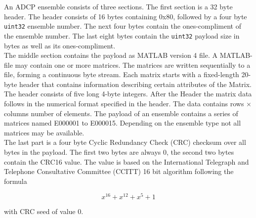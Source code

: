 An ADCP ensemble consists of three sections. The first section is a 32 byte header. The header consists of 16 bytes containing 0x80, followed by a four byte \texttt{uint32} ensemble number. The next four bytes contain the ones-compliment of the ensemble number. The last eight bytes contain the \texttt{uint32} payload size in bytes as well as its ones-compliment.\\
The middle section contains the payload as MATLAB version 4 file. A MATLAB-file may contain one or more matrices. The matrices are written sequentially to a file,  forming a continuous byte stream. Each matrix starts with a fixed-length 20-byte header that contains information describing certain attributes of the Matrix. The header consists of five long 4-byte integers. After the Header the matrix data follows in the numerical format specified in the header. The data contains rows $\times$ columns number of elements.
The payload of an ensemble contains a series of matrices named E000001 to E000015. Depending on the ensemble type not all matrices may be available.\\
The last part is a four byte Cyclic Redundancy Check (CRC) checksum over all bytes in the payload. The first two bytes are always 0, the second two bytes contain the CRC16 value. The value is based on the International Telegraph and Telephone Consultative Committee (CCITT) 16 bit algorithm following the formula 

$$ x^{16} + x^{12} + x^5 +1$$

with CRC seed of value 0.

